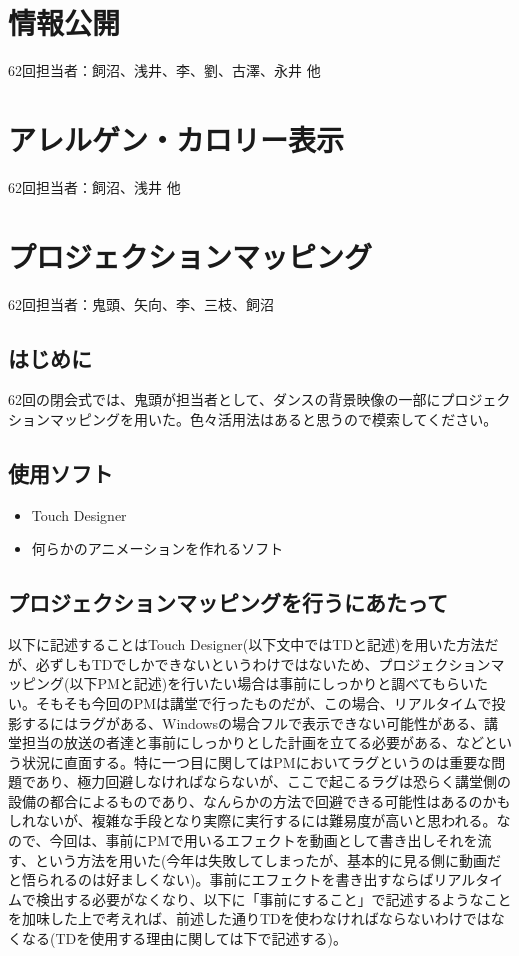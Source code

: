 \documentclass[dvipdfmx,jb5]{jarticle}
\begin{document}
 \section{情報公開}
62回担当者：飼沼、浅井、李、劉、古澤、永井 他

\section{アレルゲン・カロリー表示}\label{sec:アレルゲン・カロリー表示}
62回担当者：飼沼、浅井 他

\section{プロジェクションマッピング}
62回担当者：鬼頭、矢向、李、三枝、飼沼
\subsection{はじめに}
62回の閉会式では、鬼頭が担当者として、ダンスの背景映像の一部にプロジェクションマッピングを用いた。色々活用法はあると思うので模索してください。

\subsection{使用ソフト}
\begin{itemize}
  \item Touch Designer
  \item 何らかのアニメーションを作れるソフト
\end{itemize}
\subsection{プロジェクションマッピングを行うにあたって}
以下に記述することはTouch Designer(以下文中ではTDと記述)を用いた方法だが、必ずしもTDでしかできないというわけではないため、プロジェクションマッピング(以下PMと記述)を行いたい場合は事前にしっかりと調べてもらいたい。そもそも今回のPMは講堂で行ったものだが、この場合、リアルタイムで投影するにはラグがある、Windowsの場合フルで表示できない可能性がある、講堂担当の放送の者達と事前にしっかりとした計画を立てる必要がある、などという状況に直面する。特に一つ目に関してはPMにおいてラグというのは重要な問題であり、極力回避しなければならないが、ここで起こるラグは恐らく講堂側の設備の都合によるものであり、なんらかの方法で回避できる可能性はあるのかもしれないが、複雑な手段となり実際に実行するには難易度が高いと思われる。なので、今回は、事前にPMで用いるエフェクトを動画として書き出しそれを流す、という方法を用いた(今年は失敗してしまったが、基本的に見る側に動画だと悟られるのは好ましくない)。事前にエフェクトを書き出すならばリアルタイムで検出する必要がなくなり、以下に「事前にすること」で記述するようなことを加味した上で考えれば、前述した通りTDを使わなければならないわけではなくなる(TDを使用する理由に関しては下で記述する)。
\end{document}
